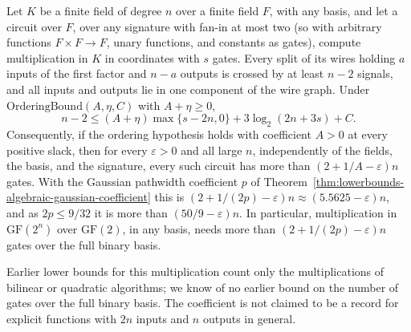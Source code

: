 \begin{theorem}
  \label{thm:lowerbounds-algebraic-field-mul}
  \leanok
  Let $K$ be a finite field of degree $n$ over a finite field $F$, with any
  basis, and let a circuit over $F$, over any signature with fan-in at most
  two (so with arbitrary functions $F\times F\to F$, unary functions, and
  constants as gates), compute multiplication in $K$ in coordinates with $s$
  gates. Every split of its wires holding $a$ inputs of the first factor and
  $n-a$ outputs is crossed by at least $n-2$ signals, and all inputs and
  outputs lie in one component of the wire graph. Under
  $\mathrm{OrderingBound}(A,\eta,C)$ with $A+\eta\ge0$,
  \[
    n - 2 \le (A+\eta)\max\{s-2n,0\} + 3\log_2(2n+3s) + C .
  \]
  Consequently, if the ordering hypothesis holds with coefficient $A>0$ at
  every positive slack, then for every $\varepsilon>0$ and all large $n$,
  independently of the fields, the basis, and the signature, every such
  circuit has more than $(2+1/A-\varepsilon)n$ gates. With the Gaussian
  pathwidth coefficient $p$ of
  Theorem~\ref{thm:lowerbounds-algebraic-gaussian-coefficient} this is
  $(2+1/(2p)-\varepsilon)n\approx(5.5625-\varepsilon)n$, and as $2p\le9/32$
  it is more than $(50/9-\varepsilon)n$. In particular, multiplication in
  $\mathrm{GF}(2^n)$ over $\mathrm{GF}(2)$, in any basis, needs more than
  $(2+1/(2p)-\varepsilon)n$ gates over the full binary basis.

  Earlier lower bounds for this multiplication count only the
  multiplications of bilinear or quadratic algorithms; we know of no earlier
  bound on the number of gates over the full binary basis. The coefficient
  is not claimed to be a record for explicit functions with $2n$ inputs and
  $n$ outputs in general.
\end{theorem}
